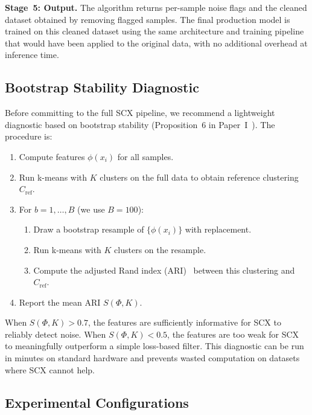 \textbf{Stage~5: Output.} The algorithm returns per-sample noise flags and the cleaned dataset obtained by removing flagged samples. The final production model is trained on this cleaned dataset using the same architecture and training pipeline that would have been applied to the original data, with no additional overhead at inference time.

\subsection{Bootstrap Stability Diagnostic}

Before committing to the full SCX pipeline, we recommend a lightweight diagnostic based on bootstrap stability (Proposition~6 in Paper~I~\cite{xi2025fundamental}). The procedure is:

\begin{enumerate}
    \item Compute features $\phi(x_i)$ for all samples.
    \item Run k-means with $K$ clusters on the full data to obtain reference clustering $C_{\text{ref}}$.
    \item For $b = 1, \ldots, B$ (we use $B = 100$):
    \begin{enumerate}
        \item Draw a bootstrap resample of $\{\phi(x_i)\}$ with replacement.
        \item Run k-means with $K$ clusters on the resample.
        \item Compute the adjusted Rand index (ARI)~\cite{hubert1985comparing} between this clustering and $C_{\text{ref}}$.
    \end{enumerate}
    \item Report the mean ARI $S(\Phi, K)$.
\end{enumerate}

When $S(\Phi, K) > 0.7$, the features are sufficiently informative for SCX to reliably detect noise. When $S(\Phi, K) < 0.5$, the features are too weak for SCX to meaningfully outperform a simple loss-based filter. This diagnostic can be run in minutes on standard hardware and prevents wasted computation on datasets where SCX cannot help.

\subsection{Experimental Configurations}

